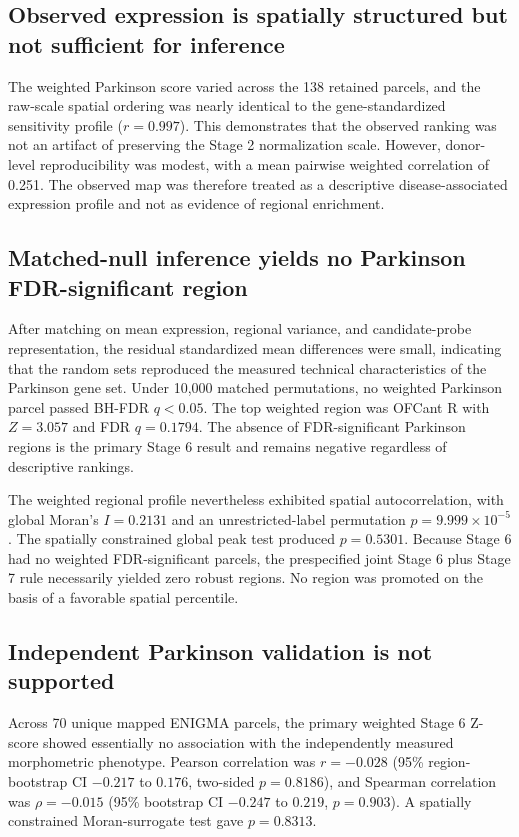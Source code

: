\documentclass[10pt,twocolumn]{article}
\begin{document}
\subsection{Observed expression is spatially structured but not sufficient for inference}

The weighted Parkinson score varied across the 138 retained parcels, and the raw-scale spatial ordering was nearly identical to the gene-standardized sensitivity profile ($r=0.997$). This demonstrates that the observed ranking was not an artifact of preserving the Stage 2 normalization scale. However, donor-level reproducibility was modest, with a mean pairwise weighted correlation of 0.251. The observed map was therefore treated as a descriptive disease-associated expression profile and not as evidence of regional enrichment.

\subsection{Matched-null inference yields no Parkinson FDR-significant region}

After matching on mean expression, regional variance, and candidate-probe representation, the residual standardized mean differences were small, indicating that the random sets reproduced the measured technical characteristics of the Parkinson gene set. Under 10,000 matched permutations, no weighted Parkinson parcel passed BH-FDR $q<0.05$. The top weighted region was OFCant R with $Z=3.057$ and FDR $q=0.1794$. The absence of FDR-significant Parkinson regions is the primary Stage 6 result and remains negative regardless of descriptive rankings.

The weighted regional profile nevertheless exhibited spatial autocorrelation, with global Moran's $I=0.2131$ and an unrestricted-label permutation $p=9.999\times10^{-5}$. The spatially constrained global peak test produced $p=0.5301$. Because Stage 6 had no weighted FDR-significant parcels, the prespecified joint Stage 6 plus Stage 7 rule necessarily yielded zero robust regions. No region was promoted on the basis of a favorable spatial percentile.

\subsection{Independent Parkinson validation is not supported}

Across 70 unique mapped ENIGMA parcels, the primary weighted Stage 6 Z-score showed essentially no association with the independently measured morphometric phenotype. Pearson correlation was $r=-0.028$ (95\% region-bootstrap CI $-0.217$ to $0.176$, two-sided $p=0.8186$), and Spearman correlation was $\rho=-0.015$ (95\% bootstrap CI $-0.247$ to $0.219$, $p=0.903$). A spatially constrained Moran-surrogate test gave $p=0.8313$.
\end{document}
